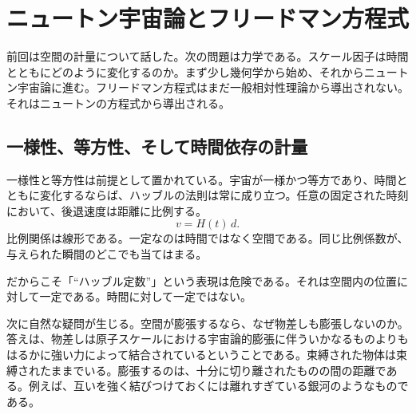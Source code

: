 \chapter{ニュートン宇宙論とフリードマン方程式}

前回は空間の計量について話した。次の問題は力学である。スケール因子は時間とともにどのように変化するのか。まず少し幾何学から始め、それからニュートン宇宙論に進む。フリードマン方程式はまだ一般相対性理論から導出されない。それはニュートンの方程式から導出される。

\section{一様性、等方性、そして時間依存の計量}

一様性と等方性は前提として置かれている。宇宙が一様かつ等方であり、時間とともに変化するならば、ハッブルの法則は常に成り立つ。任意の固定された時刻において、後退速度は距離に比例する。
\begin{equation}
v = H(t)\,d.
\end{equation}
比例関係は線形である。一定なのは時間ではなく空間である。同じ比例係数が、与えられた瞬間のどこでも当てはまる。

\begin{classroomqa}
\end{classroomqa}

だからこそ「``ハッブル定数''」という表現は危険である。それは空間内の位置に対して一定である。時間に対して一定ではない。

次に自然な疑問が生じる。空間が膨張するなら、なぜ物差しも膨張しないのか。答えは、物差しは原子スケールにおける宇宙論的膨張に伴ういかなるものよりもはるかに強い力によって結合されているということである。束縛された物体は束縛されたままでいる。膨張するのは、十分に切り離されたものの間の距離である。例えば、互いを強く結びつけておくには離れすぎている銀河のようなものである。

\begin{classroomqa}
\end{classroomqa}

